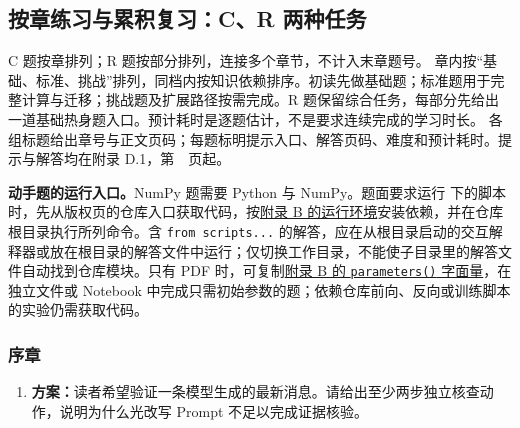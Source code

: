 \subsection{按章练习与累积复习：C、R 两种任务}
\label{app:exercise-bank}
C 题按章排列；R 题按部分排列，连接多个章节，不计入末章题号。
章内按“基础、标准、挑战”排列，同档内按知识依赖排序。初读先做基础题；标准题用于完整计算与迁移；挑战题及扩展路径按需完成。R 题保留综合任务，每部分先给出一道基础热身题入口。预计耗时是逐题估计，不是要求连续完成的学习时长。
各组标题给出章号与正文页码；每题标明提示入口、解答页码、难度和预计耗时。提示与解答均在附录 D.1，第~\pageref*{app:answers}~页起。
\par\textbf{动手题的运行入口。}\label{app:exercise-runtime}NumPy 题需要 Python 与 NumPy。题面要求运行  下的脚本时，先从版权页的仓库入口获取代码，按\hyperref[app:pytorch-lab]{附录 B 的运行环境}安装依赖，并在仓库根目录执行所列命令。含 \texttt{from scripts...} 的解答，应在从根目录启动的交互解释器或放在根目录的解答文件中运行；仅切换工作目录，不能使子目录里的解答文件自动找到仓库模块。只有 PDF 时，可复制\hyperref[app:parameter-literal]{附录 B 的 \texttt{parameters()} 字面量}，在独立文件或 Notebook 中完成只需初始参数的题；依赖仓库前向、反向或训练脚本的实验仍需获取代码。
\subsubsection*{序章}
\begin{enumerate}[label={},leftmargin=4.8em,itemsep=4pt]
\item[\textbf{C-001.}] \leavevmode{}\label{exercise:C-001}\label{exercise:verify-generated-news}\textbf{方案：}读者希望验证一条模型生成的最新消息。请给出至少两步独立核查动作，说明为什么光改写 Prompt 不足以完成证据核验。
\end{enumerate}
